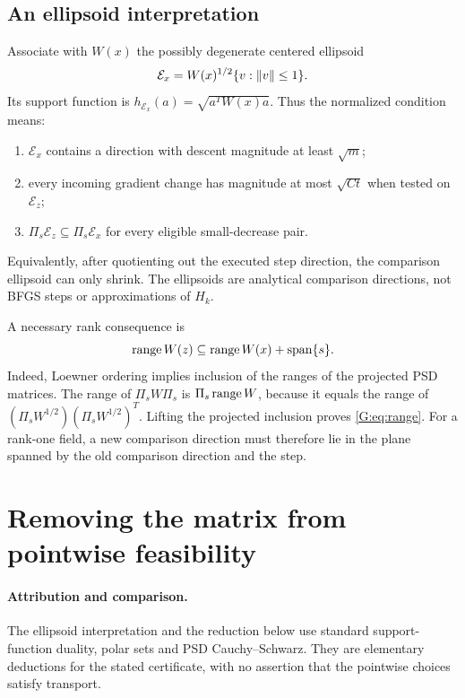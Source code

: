 \subsection{An ellipsoid interpretation}
Associate with $W(x)$ the possibly degenerate centered ellipsoid
\[
 \mathcal E_x=W(x)^{1/2}\{v:\left\|v\right\|\le1\}.
\]
Its support function is $h_{\mathcal E_x}(a)=\sqrt{a^TW(x)a}$. Thus the normalized condition means:
\begin{enumerate}[label=(\roman*),itemsep=3pt]
\item $\mathcal E_x$ contains a direction with descent magnitude at least $\sqrt m$;
\item every incoming gradient change has magnitude at most $\sqrt{Ct}$ when tested on $\mathcal E_z$;
\item $\Pi_s\mathcal E_z\subseteq\Pi_s\mathcal E_x$ for every eligible small-decrease pair.
\end{enumerate}
Equivalently, after quotienting out the executed step direction, the comparison ellipsoid can only shrink. The ellipsoids are analytical comparison directions, not BFGS steps or approximations of $H_k$.

A necessary rank consequence is
\begin{equation}
 \operatorname{range} W(z)\subseteq\operatorname{range} W(x)+\operatorname{span}\{s\}. \label{G:eq:range}
\end{equation}
Indeed, Loewner ordering implies inclusion of the ranges of the projected PSD matrices. The range of $\Pi_sW\Pi_s$ is $\Pi_s\operatorname{range} W$, because it equals the range of $(\Pi_sW^{1/2})(\Pi_sW^{1/2})^T$. Lifting the projected inclusion proves \eqref{G:eq:range}. For a rank-one field, a new comparison direction must therefore lie in the plane spanned by the old comparison direction and the step.


\setcounter{section}{2}
\setcounter{theorem}{0}
\setcounter{equation}{3}
\section{Removing the matrix from pointwise feasibility}
\paragraph{Attribution and comparison.}
The ellipsoid interpretation and the reduction below use standard support-function duality, polar sets and PSD Cauchy--Schwarz. They are elementary deductions for the stated certificate, with no assertion that the pointwise choices satisfy transport.

